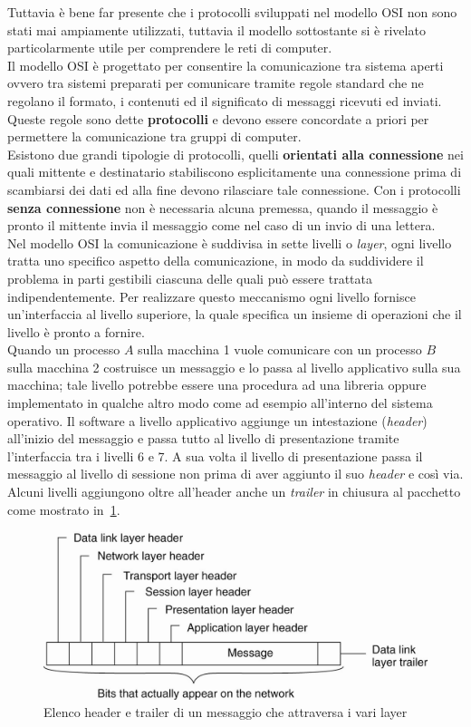 Tuttavia è bene far presente che i protocolli sviluppati nel modello OSI non sono stati mai ampiamente utilizzati, tuttavia il modello sottostante si è rivelato particolarmente utile per comprendere le reti di computer.\\
Il modello OSI è progettato per consentire la comunicazione tra sistema aperti ovvero tra sistemi preparati per comunicare tramite regole standard che ne regolano il formato, i contenuti ed il significato di messaggi ricevuti ed inviati. Queste regole sono dette \textbf{protocolli} e devono essere concordate a priori per permettere la comunicazione tra gruppi di computer.\\
Esistono due grandi tipologie di protocolli, quelli \textbf{orientati alla connessione} nei quali mittente e destinatario stabiliscono esplicitamente una connessione prima di scambiarsi dei dati ed alla fine devono rilasciare tale connessione.
Con i protocolli \textbf{senza connessione} non è necessaria alcuna premessa, quando il messaggio è pronto il mittente invia il messaggio come nel caso di un invio di una lettera.\\
Nel modello OSI la comunicazione è suddivisa in sette livelli o \emph{layer}, ogni livello tratta uno specifico aspetto della comunicazione, in modo da suddividere il problema in parti gestibili ciascuna delle quali può essere trattata indipendentemente. Per realizzare questo meccanismo ogni livello fornisce un'interfaccia al livello superiore, la quale specifica un insieme di operazioni che il livello è pronto a fornire.\\
Quando un processo $A$ sulla macchina 1 vuole comunicare con un processo $B$ sulla macchina 2 costruisce un messaggio e lo passa al livello applicativo sulla sua macchina; tale livello potrebbe essere una procedura ad una libreria oppure implementato in qualche altro modo come ad esempio all'interno del sistema operativo. Il software a livello applicativo aggiunge un intestazione (\emph{header}) all'inizio del messaggio e passa tutto al livello di presentazione tramite l'interfaccia tra i livelli 6 e 7. A sua volta il livello di presentazione passa il messaggio al livello di sessione non prima di aver aggiunto il suo \emph{header} e così via. Alcuni livelli aggiungono oltre all'header anche un \emph{trailer} in chiusura al pacchetto come mostrato in \figurename\,\ref{img:header}.
\begin{figure}[htb]
\centering
\includegraphics[scale=0.4]{img/header.png}
\caption{Elenco header e trailer di un messaggio che attraversa i vari layer}\label{img:header}
\end{figure}
